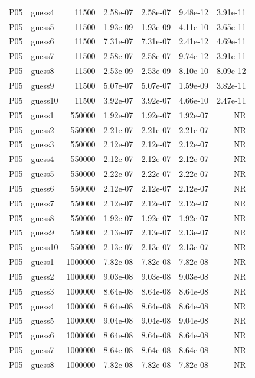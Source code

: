 {\begin{longtable}{llrrrrr}
P05 & guess4 & 11500 & 2.58e-07 & 2.58e-07 & 9.48e-12 & 3.91e-11 \\
P05 & guess5 & 11500 & 1.93e-09 & 1.93e-09 & 4.11e-10 & 3.65e-11 \\
P05 & guess6 & 11500 & 7.31e-07 & 7.31e-07 & 2.41e-12 & 4.69e-11 \\
P05 & guess7 & 11500 & 2.58e-07 & 2.58e-07 & 9.74e-12 & 3.91e-11 \\
P05 & guess8 & 11500 & 2.53e-09 & 2.53e-09 & 8.10e-10 & 8.09e-12 \\
P05 & guess9 & 11500 & 5.07e-07 & 5.07e-07 & 1.59e-09 & 3.82e-11 \\
P05 & guess10 & 11500 & 3.92e-07 & 3.92e-07 & 4.66e-10 & 2.47e-11 \\
P05 & guess1 & 550000 & 1.92e-07 & 1.92e-07 & 1.92e-07 & NR \\
P05 & guess2 & 550000 & 2.21e-07 & 2.21e-07 & 2.21e-07 & NR \\
P05 & guess3 & 550000 & 2.12e-07 & 2.12e-07 & 2.12e-07 & NR \\
P05 & guess4 & 550000 & 2.12e-07 & 2.12e-07 & 2.12e-07 & NR \\
P05 & guess5 & 550000 & 2.22e-07 & 2.22e-07 & 2.22e-07 & NR \\
P05 & guess6 & 550000 & 2.12e-07 & 2.12e-07 & 2.12e-07 & NR \\
P05 & guess7 & 550000 & 2.12e-07 & 2.12e-07 & 2.12e-07 & NR \\
P05 & guess8 & 550000 & 1.92e-07 & 1.92e-07 & 1.92e-07 & NR \\
P05 & guess9 & 550000 & 2.13e-07 & 2.13e-07 & 2.13e-07 & NR \\
P05 & guess10 & 550000 & 2.13e-07 & 2.13e-07 & 2.13e-07 & NR \\
P05 & guess1 & 1000000 & 7.82e-08 & 7.82e-08 & 7.82e-08 & NR \\
P05 & guess2 & 1000000 & 9.03e-08 & 9.03e-08 & 9.03e-08 & NR \\
P05 & guess3 & 1000000 & 8.64e-08 & 8.64e-08 & 8.64e-08 & NR \\
P05 & guess4 & 1000000 & 8.64e-08 & 8.64e-08 & 8.64e-08 & NR \\
P05 & guess5 & 1000000 & 9.04e-08 & 9.04e-08 & 9.04e-08 & NR \\
P05 & guess6 & 1000000 & 8.64e-08 & 8.64e-08 & 8.64e-08 & NR \\
P05 & guess7 & 1000000 & 8.64e-08 & 8.64e-08 & 8.64e-08 & NR \\
P05 & guess8 & 1000000 & 7.82e-08 & 7.82e-08 & 7.82e-08 & NR \\

\end{longtable}}
